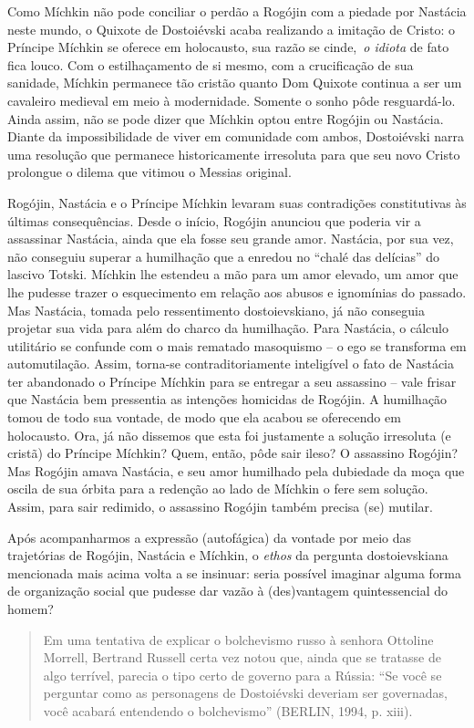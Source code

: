 Como Míchkin não pode conciliar o perdão a Rogójin com a piedade por
Nastácia neste mundo, o Quixote de Dostoiévski acaba realizando a
imitação de Cristo: o Príncipe Míchkin se oferece em holocausto, sua
razão se cinde,~\emph{o idiota} de fato fica louco. Com o estilhaçamento
de si mesmo, com a crucificação de sua sanidade, Míchkin permanece tão
cristão quanto Dom Quixote continua a ser um cavaleiro medieval em meio
à modernidade. Somente o sonho pôde resguardá-lo. Ainda assim, não se
pode dizer que Míchkin optou entre Rogójin ou Nastácia. Diante da
impossibilidade de viver em comunidade com ambos, Dostoiévski narra uma
resolução que permanece historicamente irresoluta para que seu novo
Cristo prolongue o dilema que vitimou o Messias original.

Rogójin, Nastácia e o Príncipe Míchkin levaram suas contradições
constitutivas às últimas consequências. Desde o início, Rogójin anunciou
que poderia vir a assassinar Nastácia, ainda que ela fosse seu grande
amor. Nastácia, por sua vez, não conseguiu superar a humilhação que a
enredou no ``chalé das delícias'' do lascivo Totski. Míchkin lhe
estendeu a mão para um amor elevado, um amor que lhe pudesse trazer o
esquecimento em relação aos abusos e ignomínias do passado. Mas
Nastácia, tomada pelo ressentimento dostoievskiano, já não conseguia
projetar sua vida para além do charco da humilhação. Para Nastácia, o
cálculo utilitário se confunde com o mais rematado masoquismo -- o ego
se transforma em automutilação. Assim, torna-se contraditoriamente
inteligível o fato de Nastácia ter abandonado o Príncipe Míchkin para se
entregar a seu assassino -- vale frisar que Nastácia bem pressentia as
intenções homicidas de Rogójin. A humilhação tomou de todo sua vontade,
de modo que ela acabou se oferecendo em holocausto. Ora, já não dissemos
que esta foi justamente a solução irresoluta (e cristã) do Príncipe
Míchkin? Quem, então, pôde sair ileso? O assassino Rogójin? Mas Rogójin
amava Nastácia, e seu amor humilhado pela dubiedade da moça que oscila
de sua órbita para a redenção ao lado de Míchkin o fere sem solução.
Assim, para sair redimido, o assassino Rogójin também precisa (se)
mutilar.

Após acompanharmos a expressão (autofágica) da vontade por meio das
trajetórias de Rogójin, Nastácia e Míchkin, o \emph{ethos} da pergunta
dostoievskiana mencionada mais acima volta a se insinuar: seria possível
imaginar alguma forma de organização social que pudesse dar vazão à
(des)vantagem quintessencial do homem?

\begin{quote}
Em uma tentativa de explicar o bolchevismo russo à senhora Ottoline
Morrell, Bertrand Russell certa vez notou que, ainda que se tratasse de
algo terrível, parecia o tipo certo de governo para a Rússia: ``Se você
se perguntar como as personagens de Dostoiévski deveriam ser governadas,
você acabará entendendo o bolchevismo'' (BERLIN, 1994, p. xiii).
\end{quote}

